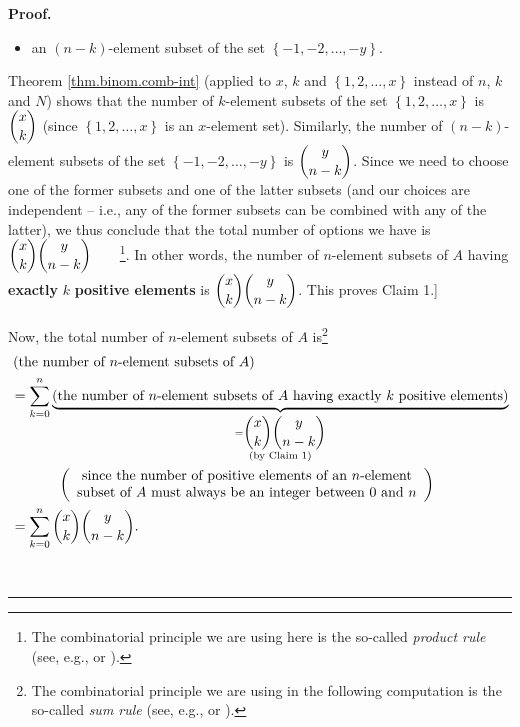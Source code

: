 \documentclass[numbers=enddot,12pt,final,onecolumn,notitlepage]{scrartcl}%
\numberwithin{exer}{subsection}
\theoremstyle{definition}
\newenvironment{proof}[1][Proof]{\noindent\textbf{#1.} }{\ \rule{0.5em}{0.5em}}
\let\sumnonlimits\sum
\renewcommand{\sum}{\sumnonlimits\limits}
\begin{document}
\begin{proof}
\begin{itemize}
\begin{itemize}
\item an $\left(  n-k\right)  $-element subset of the set $\left\{
-1,-2,\ldots,-y\right\}  $.
\end{itemize}

Theorem \ref{thm.binom.comb-int} (applied to $x$, $k$ and $\left\{
1,2,\ldots,x\right\}  $ instead of $n$, $k$ and $N$) shows that the number of
$k$-element subsets of the set $\left\{  1,2,\ldots,x\right\}  $ is
$\dbinom{x}{k}$ (since $\left\{  1,2,\ldots,x\right\}  $ is an $x$-element
set). Similarly, the number of $\left(  n-k\right)  $-element subsets of the
set $\left\{  -1,-2,\ldots,-y\right\}  $ is $\dbinom{y}{n-k}$. Since we need
to choose one of the former subsets and one of the latter subsets (and our
choices are independent -- i.e., any of the former subsets can be combined
with any of the latter), we thus conclude that the total number of options we
have is $\dbinom{x}{k}\dbinom{y}{n-k}$\ \ \ \ \footnote{The combinatorial
principle we are using here is the so-called \textit{product rule} (see, e.g.,
\cite[1.8]{Loehr-BC} or \cite[\S 15.2.1]{LeLeMe}).}. In other words, the
number of $n$-element subsets of $A$ having \textbf{exactly }$k$
\textbf{positive elements} is $\dbinom{x}{k}\dbinom{y}{n-k}$. This proves
Claim 1.]

Now, the total number of $n$-element subsets of $A$ is\footnote{The
combinatorial principle we are using in the following computation is the
so-called \textit{sum rule} (see, e.g., \cite[1.2]{Loehr-BC} or
\cite[\S 15.2.3]{LeLeMe}).}%
\begin{align*}
&  \left(  \text{the number of }n\text{-element subsets of }A\right) \\
&  =\sum_{k=0}^{n}\underbrace{\left(  \text{the number of }n\text{-element
subsets of }A\text{ having exactly }k\text{ positive elements}\right)
}_{\substack{=\dbinom{x}{k}\dbinom{y}{n-k}\\\text{(by Claim 1)}}}\\
&  \ \ \ \ \ \ \ \ \ \ \left(
\begin{array}
[c]{c}%
\text{since the number of positive elements of an }n\text{-element}\\
\text{subset of }A\text{ must always be an integer between }0\text{ and }n
\end{array}
\right) \\
&  =\sum_{k=0}^{n}\dbinom{x}{k}\dbinom{y}{n-k}.
\end{align*}

\end{itemize}


\end{proof}
\end{document}
